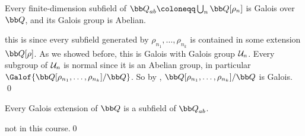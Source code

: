 \bcoro

    Every finite-dimension subfield of ${\bb Q}_{ab}\coloneqq\bigcup_n{\bb Q}[\rho_n]$ is Galois over ${\bb Q}$, and its Galois group is Abelian.

\ecoro

\Proof this is since every subfield generated by $\rho_{n_1},\dots,\rho_{n_k}$ is contained in some extension ${\bb Q}[\rho]$.
As we showed before, this is Galois with Galois group ${\cal U}_n$.
Every subgroup of ${\cal U}_n$ is normal since it is an Abelian group, in particular $\Galof{{\bb Q}[\rho_{n_1},\dots,\rho_{n_k}]/{\bb Q}}$.
So by , ${\bb Q}[\rho_{n_1},\dots,\rho_{n_k}]/{\bb Q}$ is Galois.
\qed

\bthrm[title=Kronecker-Weber Theorem]

    Every Galois extension of ${\bb Q}$ is a subfield of ${\bb Q}_{ab}$.

\ethrm

\Proof not in this course.\qed

